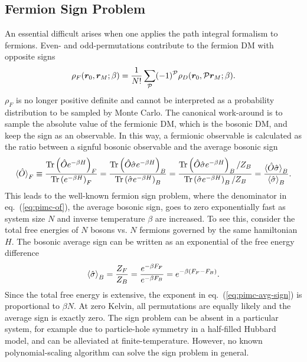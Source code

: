 \subsection{Fermion Sign Problem} \label{sec:fermion-sign-problem}
An essential difficult arises when one applies the path integral formalism to fermions. Even- and odd-permutations contribute to the fermion DM with opposite signs
\begin{align}
\rho_F(\boldsymbol{r}_0,\boldsymbol{r}_M;\beta) = \frac{1}{N!}\sum\limits_{\mathcal{P}} (-1)^{\mathcal{P}} \rho_D(\boldsymbol{r}_0, \mathcal{P}\boldsymbol{r}_M;\beta).
\end{align}
$\rho_F$ is no longer positive definite and cannot be interpreted as a probability distribution to be sampled by Monte Carlo. The canonical work-around is to sample the absolute value of the fermionic DM, which is the bosonic DM, and keep the sign as an observable. In this way, a fermionic observable is calculated as the ratio between a signful bosonic observable and the average bosonic sign
\begin{align} \label{eq:pimc-of}
\braket{\hat{O}}_F \equiv \dfrac{\text{Tr}\left(\hat{O}e^{-\beta H}\right)_F}{\text{Tr}\left(e^{-\beta H}\right)_F}=
\dfrac{\text{Tr}\left(\hat{O}\hat{\sigma}e^{-\beta H}\right)_B}{\text{Tr}\left(\hat{\sigma} e^{-\beta H}\right)_B}=
\dfrac{\text{Tr}\left(\hat{O}\hat{\sigma}e^{-\beta H}\right)_B/Z_B}{\text{Tr}\left(\hat{\sigma} e^{-\beta H}\right)_B/Z_B}=\dfrac{\braket{\hat{O}\hat{\sigma}}_B}{ \braket{\hat{\sigma}}_B }.
\end{align}
This leads to the well-known fermion sign problem, where the denominator in eq.~(\ref{eq:pimc-of}), the average bosonic sign, goes to zero exponentially fast as system size $N$ and inverse temperature $\beta$ are increased.
To see this, consider the total free energies of $N$ bosons vs. $N$ fermions governed by the same hamiltonian $H$. The bosonic average sign can be written as an exponential of the free energy difference
\begin{align} \label{eq:pimc-avg-sign}
\braket{\hat{\sigma}}_B = \dfrac{Z_F}{Z_B} = \dfrac{e^{-\beta F_F}}{e^{-\beta F_B}} = e^{-\beta (F_F-F_B)}.
\end{align}
Since the total free energy is extensive, the exponent in eq.~(\ref{eq:pimc-avg-sign}) is proportional to $\beta N$.
At zero Kelvin, all permutations are equally likely and the average sign is exactly zero. The sign problem can be absent in a particular system, for example due to particle-hole symmetry in a half-filled Hubbard model, and can be alleviated at finite-temperature. However, no known polynomial-scaling algorithm can solve the sign problem in general.

